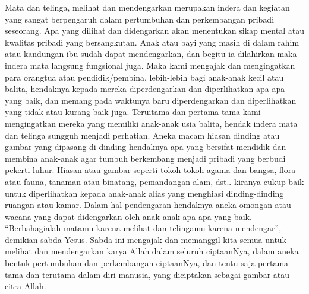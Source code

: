 \documentclass[a5paper,headsepline,titlepage,12pt,nnormalheadings,DIVcalc]{scrbook}
\begin{document}
Mata dan telinga, melihat dan mendengarkan merupakan indera dan kegiatan yang sangat berpengaruh dalam pertumbuhan dan perkembangan pribadi seseorang. Apa yang dilihat dan didengarkan akan menentukan sikap mental atau kwalitas pribadi yang bersangkutan. Anak atau bayi yang masih di dalam rahim atau kandungan ibu sudah dapat mendengarkan, dan begitu ia dilahirkan maka indera mata langsung fungsional juga. Maka kami mengajak dan mengingatkan para orangtua atau pendidik/pembina, lebih-lebih bagi anak-anak kecil atau balita, hendaknya kepada mereka diperdengarkan dan diperlihatkan apa-apa yang baik, dan memang pada waktunya baru diperdengarkan dan diperlihatkan yang tidak atau kurang baik juga. Teruitama dan pertama-tama kami mengingatkan mereka yang memiliki anak-anak usia balita, hendak indera mata dan telinga sungguh menjadi perhatian. Aneka macam hiasan dinding atau gambar yang dipasang di dinding hendaknya apa yang bersifat mendidik dan membina anak-anak agar tumbuh berkembang menjadi pribadi yang berbudi pekerti luhur. Hiasan atau gambar seperti tokoh-tokoh agama dan bangsa, flora atau fauna, tanaman atau binatang, pemandangan alam, dst.. kiranya cukup baik untuk diperlihatkan kepada anak-anak alias yang menghiasi dinding-dinding ruangan atau kamar. Dalam hal pendengaran hendaknya aneka omongan atau wacana yang dapat didengarkan oleh anak-anak apa-apa yang baik. “Berbahagialah matamu karena melihat dan telingamu karena mendengar”, demikian sabda Yesus. Sabda ini mengajak dan memanggil kita semua untuk melihat dan mendengarkan karya Allah dalam seluruh ciptaanNya, dalam aneka bentuk pertumbuhan dan perkembangan ciptaanNya, dan tentu saja pertama-tama dan terutama dalam diri manusia, yang diciptakan sebagai gambar atau citra Allah.
\end{document}
